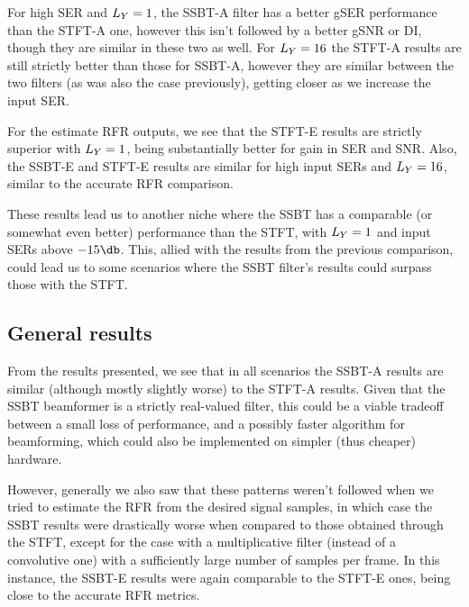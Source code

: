 For high SER and $\Ly = 1$, the SSBT-A filter has a better gSER performance than the STFT-A one, however this isn't followed by a better gSNR or DI, though they are similar in these two as well. For $\Ly = 16$ the STFT-A results are still strictly better than those for SSBT-A, however they are similar between the two filters (as was also the case previously), getting closer as we increase the input SER.

For the estimate RFR outputs, we see that the STFT-E results are strictly superior with $\Ly = 1$, being substantially better for gain in SER and SNR. Also, the SSBT-E and STFT-E results are similar for high input SERs and $\Ly = 16$, similar to the accurate RFR comparison.

These results lead us to another niche where the SSBT has a comparable (or somewhat even better) performance than the STFT, with $\Ly = 1$ and input SERs above $-15\dB$. This, allied with the results from the previous comparison, could lead us to some scenarios where the SSBT filter's results could surpass those with the STFT.

\subsection{General results}

From the results presented, we see that in all scenarios the SSBT-A results are similar (although mostly slightly worse) to the STFT-A results. Given that the SSBT beamformer is a strictly real-valued filter, this could be a viable tradeoff between a small loss of performance, and a possibly faster algorithm for beamforming, which could also be implemented on simpler (thus cheaper) hardware.

However, generally we also saw that these patterns weren't followed when we tried to estimate the RFR from the desired signal samples, in which case the SSBT results were drastically worse when compared to those obtained through the STFT, except for the case with a multiplicative filter (instead of a convolutive one) with a sufficiently large number of samples per frame. In this instance, the SSBT-E results were again comparable to the STFT-E ones, being close to the accurate RFR metrics.